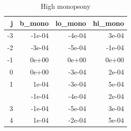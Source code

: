 \begin{table}

\caption{High monopsony}
\centering
\begin{tabular}[t]{rrrr}
\toprule
j & b\_mono & lo\_mono & hi\_mono\\
\midrule
-3 & -1e-04 & -4e-04 & 3e-04\\
-2 & -3e-04 & -5e-04 & -1e-04\\
-1 & 0e+00 & 0e+00 & 0e+00\\
0 & 0e+00 & -3e-04 & 2e-04\\
1 & 1e-04 & -3e-04 & 5e-04\\
\addlinespace
2 & -1e-04 & -4e-04 & 2e-04\\
3 & -1e-04 & -5e-04 & 3e-04\\
4 & 1e-04 & -2e-04 & 5e-04\\
\bottomrule
\end{tabular}
\end{table}
